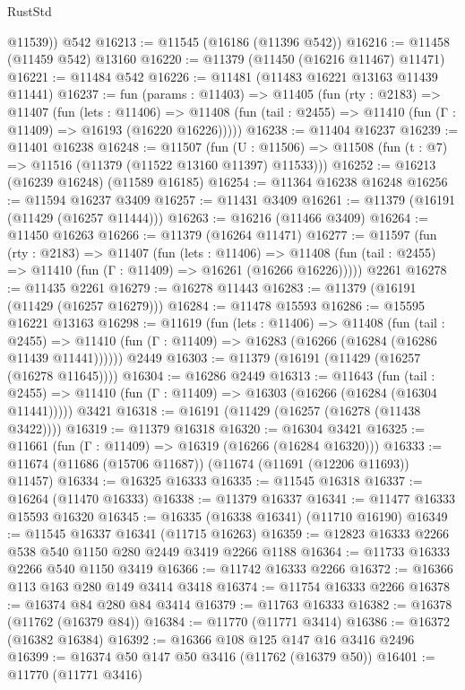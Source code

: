 \begin{lexlean}{RustStd}
\begin{coremodule}
        @11539))
    @542
@16213 := @11545 (@16186 (@11396 @542))
@16216 := @11458 (@11459 @542) @13160
@16220 := @11379 (@11450 (@16216 @11467) @11471)
@16221 := @11484 @542
@16226 := @11481 (@11483 @16221 @13163 @11439 @11441)
@16237 := fun (params : @11403) =>
  @11405
    (fun (rty : @2183) =>
    @11407
      (fun (lets : @11406) =>
      @11408 (fun (tail : @2455) => @11410 (fun (Γ : @11409) => @16193 (@16220 @16226)))))
@16238 := @11404 @16237
@16239 := @11401 @16238
@16248 := @11507
    (fun (U : @11506) => @11508 (fun (t : @7) => @11516 (@11379 (@11522 @13160 @11397) @11533)))
@16252 := @16213 (@16239 @16248) (@11589 @16185)
@16254 := @11364 @16238 @16248
@16256 := @11594 @16237 @3409
@16257 := @11431 @3409
@16261 := @11379 (@16191 (@11429 (@16257 @11444)))
@16263 := @16216 (@11466 @3409)
@16264 := @11450 @16263
@16266 := @11379 (@16264 @11471)
@16277 := @11597
    (fun (rty : @2183) =>
    @11407
      (fun (lets : @11406) =>
      @11408 (fun (tail : @2455) => @11410 (fun (Γ : @11409) => @16261 (@16266 @16226)))))
    @2261
@16278 := @11435 @2261
@16279 := @16278 @11443
@16283 := @11379 (@16191 (@11429 (@16257 @16279)))
@16284 := @11478 @15593
@16286 := @15595 @16221 @13163
@16298 := @11619
    (fun (lets : @11406) =>
    @11408
      (fun (tail : @2455) =>
      @11410 (fun (Γ : @11409) => @16283 (@16266 (@16284 (@16286 @11439 @11441))))))
    @2449
@16303 := @11379 (@16191 (@11429 (@16257 (@16278 @11645))))
@16304 := @16286 @2449
@16313 := @11643
    (fun (tail : @2455) => @11410 (fun (Γ : @11409) => @16303 (@16266 (@16284 (@16304 @11441)))))
    @3421
@16318 := @16191 (@11429 (@16257 (@16278 (@11438 @3422))))
@16319 := @11379 @16318
@16320 := @16304 @3421
@16325 := @11661 (fun (Γ : @11409) => @16319 (@16266 (@16284 @16320)))
@16333 := @11674 (@11686 (@15706 @11687)) (@11674 (@11691 (@12206 @11693)) @11457)
@16334 := @16325 @16333
@16335 := @11545 @16318
@16337 := @16264 (@11470 @16333)
@16338 := @11379 @16337
@16341 := @11477 @16333 @15593 @16320
@16345 := @16335 (@16338 @16341) (@11710 @16190)
@16349 := @11545 @16337 @16341 (@11715 @16263)
@16359 := @12823 @16333 @2266 @538 @540 @1150 @280 @2449 @3419 @2266 @1188
@16364 := @11733 @16333 @2266 @540 @1150 @3419
@16366 := @11742 @16333 @2266
@16372 := @16366 @113 @163 @280 @149 @3414 @3418
@16374 := @11754 @16333 @2266
@16378 := @16374 @84 @280 @84 @3414
@16379 := @11763 @16333
@16382 := @16378 (@11762 (@16379 @84))
@16384 := @11770 (@11771 @3414)
@16386 := @16372 (@16382 @16384)
@16392 := @16366 @108 @125 @147 @16 @3416 @2496
@16399 := @16374 @50 @147 @50 @3416 (@11762 (@16379 @50))
@16401 := @11770 (@11771 @3416)

\end{coremodule}
\end{lexlean}
